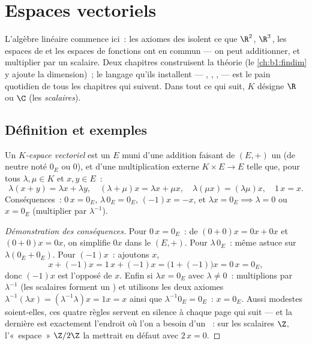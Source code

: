 \chapter{Espaces vectoriels}\label{ch:b1:vspaces}

L'algèbre linéaire commence ici~: les axiomes des 
isolent ce que $\R^2$, $\R^3$, les espaces de  et les espaces
de fonctions ont en commun --- on peut additionner, et multiplier par
un scalaire. Deux chapitres construisent la théorie
(le \cref{ch:b1:findim} y ajoute la dimension)~; le langage qu'ils
installent --- , , ,  --- est le pain quotidien de tous les chapitres qui suivent.
Dans tout ce qui suit, $K$ désigne $\R$ ou $\C$ (les
\emph{scalaires}).

\section{Définition et exemples}

\begin{definition}\label{def:b1:vspaces:def}
Un \emph{$K$-espace vectoriel} est un 
$E$ muni d'une addition faisant de $(E, +)$ un  (de
neutre noté $0_E$ ou $0$), et d'une multiplication externe $K \times E
\to E$ telle que, pour tous $\lambda, \mu \in K$ et $x, y \in E$~:
\[
\lambda(x + y) = \lambda x + \lambda y,\quad
(\lambda + \mu) x = \lambda x + \mu x,\quad
\lambda(\mu x) = (\lambda\mu) x,\quad
1\,x = x .
\]
Conséquences~: $0\,x = 0_E$, $\lambda\,0_E = 0_E$, $(-1)x = -x$, et
$\lambda x = 0_E \implies \lambda = 0$ ou $x = 0_E$ (multiplier par
$\lambda^{-1}$).
\end{definition}

\begin{proof}[Démonstration des conséquences]
Pour $0\,x = 0_E$~: de $(0 + 0)x = 0x + 0x$ et $(0+0)x = 0x$, on
simplifie $0x$ dans le  $(E, +)$. Pour $\lambda\,0_E$~: même
astuce sur $\lambda(0_E + 0_E)$. Pour $(-1)x$~: ajoutons $x$,
\[
x + (-1)x = 1\,x + (-1)x = \bigl(1 + (-1)\bigr)x = 0\,x = 0_E ,
\]
donc $(-1)x$ est l'opposé de $x$. Enfin si $\lambda x = 0_E$ avec
$\lambda \neq 0$~: multiplions par $\lambda^{-1}$ (les scalaires
forment un ) et utilisons les deux axiomes
$\lambda^{-1}(\lambda x) = (\lambda^{-1}\lambda)x = 1x = x$
ainsi que $\lambda^{-1}0_E = 0_E$~: $x = 0_E$. Aussi modestes
soient-elles, ces quatre règles servent en silence à chaque page qui
suit --- et la dernière est exactement l'endroit où l'on a besoin d'un
~: sur les scalaires $\Z$, l'«~espace~» $\Z/2\Z$ la mettrait en
défaut avec $2\,x = 0$.
\end{proof}

